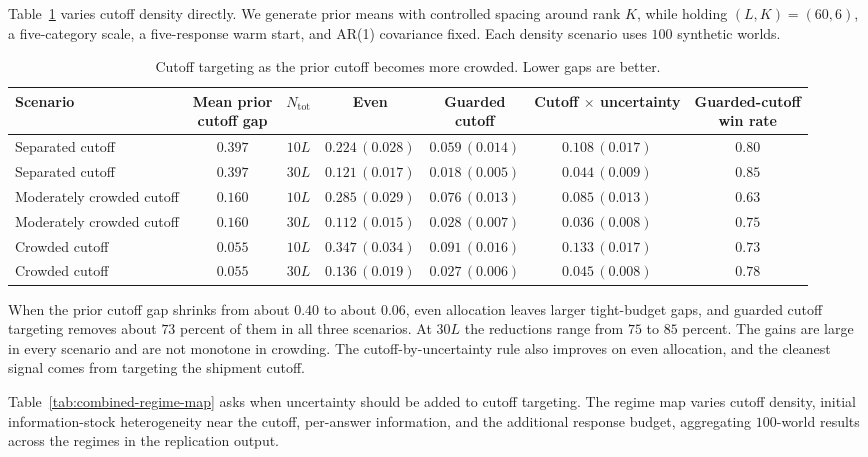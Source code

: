\documentclass[11pt]{article}
\theoremstyle{definition}
\theoremstyle{remark}
\newcommand{\1}{\mathbf{1}}
\begin{document}
Table~\ref{tab:cutoff-crowding} varies cutoff density directly. We
generate prior means with controlled spacing around rank \(K\), while
holding \((L,K)=(60,6)\), a five-category scale, a five-response warm
start, and AR(1) covariance fixed. Each density scenario uses \(100\)
synthetic worlds.

\begin{table}[h!]
\centering
\scriptsize
\setlength{\tabcolsep}{3pt}
\begin{tabular}{lcccccc}
\toprule
Scenario & \shortstack{Mean prior\\cutoff gap} & $N_{\mathrm{tot}}$ & Even & \shortstack{Guarded\\cutoff} & \shortstack{Cutoff $\times$\\uncertainty} & \shortstack{Guarded-cutoff\\win rate} \\
\midrule
Separated cutoff & $0.397$ & $10L$ & $0.224\,(0.028)$ & $0.059\,(0.014)$ & $0.108\,(0.017)$ & $0.80$ \\
Separated cutoff & $0.397$ & $30L$ & $0.121\,(0.017)$ & $0.018\,(0.005)$ & $0.044\,(0.009)$ & $0.85$ \\
Moderately crowded cutoff & $0.160$ & $10L$ & $0.285\,(0.029)$ & $0.076\,(0.013)$ & $0.085\,(0.013)$ & $0.63$ \\
Moderately crowded cutoff & $0.160$ & $30L$ & $0.112\,(0.015)$ & $0.028\,(0.007)$ & $0.036\,(0.008)$ & $0.75$ \\
Crowded cutoff & $0.055$ & $10L$ & $0.347\,(0.034)$ & $0.091\,(0.016)$ & $0.133\,(0.017)$ & $0.73$ \\
Crowded cutoff & $0.055$ & $30L$ & $0.136\,(0.019)$ & $0.027\,(0.006)$ & $0.045\,(0.008)$ & $0.78$ \\
\bottomrule
\end{tabular}
\caption{Cutoff targeting as the prior cutoff becomes more crowded. Lower gaps are better.}
\label{tab:cutoff-crowding}
\end{table}

When the prior cutoff gap shrinks from about \(0.40\) to about
\(0.06\), even allocation leaves larger tight-budget gaps, and
guarded cutoff targeting removes about \(73\) percent of them in all
three scenarios. At \(30L\) the reductions range from \(75\) to
\(85\) percent. The gains are large in every scenario and are not
monotone in crowding. The cutoff-by-uncertainty rule also improves on
even allocation, and the cleanest signal comes from targeting the
shipment cutoff.

Table~\ref{tab:combined-regime-map} asks when uncertainty should be
added to cutoff targeting. The regime map varies cutoff density,
initial information-stock heterogeneity near the cutoff, per-answer
information, and the additional response budget, aggregating
\(100\)-world results across the regimes in the replication output.
\end{document}
